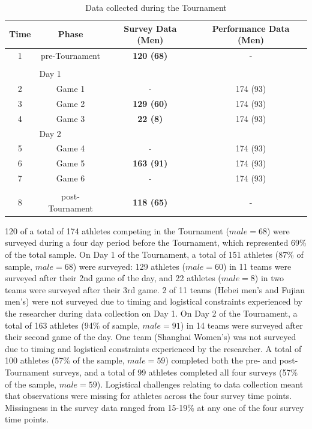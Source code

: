       \begin{table}[htbp]\caption{Data collected during the Tournament}
        \begin{center}
          \begin{small}
            \begin{tabular}{c|c c c}
                \bf Time & \bf Phase & \bf Survey Data (Men) & \bf Performance Data (Men) \\
                \hline
                1 & pre-Tournament & \bf 120 (68) & - \\
                & & & \\
                & \multicolumn{1}{l}{Day 1} & & \\
                2 & Game 1 & - & 174 (93) \\
                3 & Game 2 & \bf129 (60) & 174 (93) \\
                4 & Game 3 & \bf22 (8) & 174 (93) \\
                & \multicolumn{1}{l}{Day 2} & & \\
                5 & Game 4 & - & 174 (93) \\
                6 & Game 5 & \bf 163 (91) & 174 (93) \\
                7 & Game 6 & - & 174 (93) \\
                & & & \\
                8 & post-Tournament & \bf118 (65) & - \\
            \end{tabular}
          \end{small}
        \end{center}
        \label{tab:tournamentData}
      \end{table}

120 of a total of 174 athletes competing in the Tournament ($male = 68$) were surveyed during a four day period before the Tournament, which represented 69\% of the total sample. On Day 1 of the Tournament, a total of 151 athletes (87\% of sample, $male = 68$) were surveyed: 129 athletes ($male = 60$) in 11 teams were surveyed after their 2nd game of the day, and 22 athletes ($male = 8$) in two teams were surveyed after their 3rd game. 2 of 11 teams (Hebei men’s and Fujian men’s) were not surveyed due to timing and logistical constraints experienced by the researcher during data collection on Day 1. On Day 2 of the Tournament, a total of 163 athletes (94\% of sample, $male = 91$) in 14 teams were surveyed after their second game of the day. One team (Shanghai Women’s) was not surveyed due to timing and logistical constraints experienced by the researcher. A total of 100 athletes (57\% of the sample, $male = 59$) completed both the pre- and post-Tournament surveys, and a total of 99 athletes completed all four surveys (57\% of the sample, $male = 59$). Logistical challenges relating to data collection meant that observations were missing for athletes across the four survey time points. Missingness in the survey data ranged from 15-19\% at any one of the four survey time points.\\



